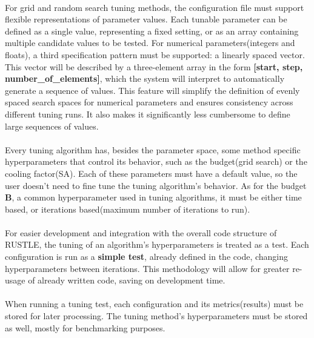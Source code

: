 \paragraph{}For grid and random search tuning methods, the configuration file must support flexible representations of parameter values. Each tunable parameter can be defined as a single value, representing a fixed setting, or as an array containing multiple candidate values to be tested. For numerical parameters(integers and floats), a third specification pattern must be supported: a linearly spaced vector. This vector will be described by a three-element array in the form \textbf{[start, step, number\_of\_elements]}, which the system will interpret to automatically generate a sequence of values. This feature will simplify the definition of evenly spaced search spaces for numerical parameters and ensures consistency across different tuning runs. It also makes it significantly less cumbersome to define large sequences of values.

\paragraph{}Every tuning algorithm has, besides the parameter space, some method specific hyperparameters that control its behavior, such as the budget(grid search) or the cooling factor(SA). Each of these parameters must have a default value, so the user doesn't need to fine tune the tuning algorithm's behavior. As for the budget \textbf{B}, a common hyperparameter used in tuning algorithms, it must be either time based, or iterations based(maximum number of iterations to run).

\paragraph{}For easier development and integration with the overall code structure of RUSTLE, the tuning of an algorithm's hyperparameters is treated as a test. Each configuration is run as a \textbf{simple test}, already defined in the code, changing hyperparameters between iterations. This methodology will allow for greater re-usage of already written code, saving on development time.

\paragraph{}When running a tuning test, each configuration and its metrics(results) must be stored for later processing. The tuning method's hyperparameters must be stored as well, mostly for benchmarking purposes.

